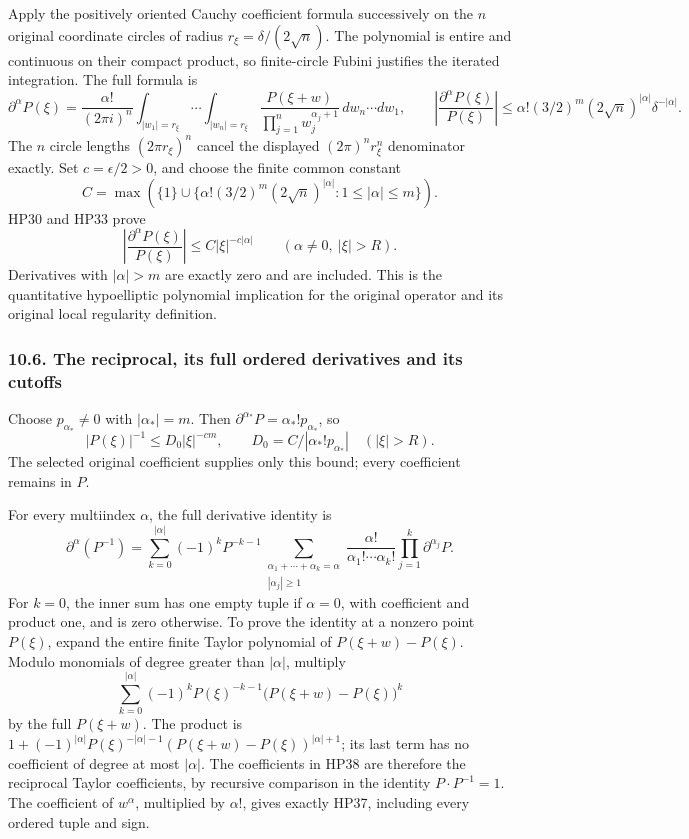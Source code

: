 \documentclass[
  11pt,
]{article}
\begin{document}
Apply the positively oriented Cauchy coefficient formula successively on
the \(n\) original coordinate circles of radius
\(r_\xi=\delta/(2\sqrt n)\). The polynomial is entire and continuous on
their compact product, so finite-circle Fubini justifies the iterated
integration. The full formula is \[
\partial^\alpha P(\xi)=
\frac{\alpha!}{(2\pi i)^n}
\int_{|w_1|=r_\xi}\cdots\int_{|w_n|=r_\xi}
\frac{P(\xi+w)}{\prod_{j=1}^{n}w_j^{\alpha_j+1}}\,
dw_n\cdots dw_1,
\qquad
\left|\frac{\partial^\alpha P(\xi)}{P(\xi)}\right|
\leq\alpha!(3/2)^m(2\sqrt n)^{|\alpha|}\delta^{-|\alpha|}.
\tag{HP33}
\] The \(n\) circle lengths \((2\pi r_\xi)^n\) cancel the displayed
\((2\pi)^n r_\xi^n\) denominator exactly. Set \(c=\epsilon/2>0\), and
choose the finite common constant \[
C=\max\left(\{1\}\cup
\{\alpha!(3/2)^m(2\sqrt n)^{|\alpha|}:1\leq|\alpha|\leq m\}\right).
\tag{HP34}
\] HP30 and HP33 prove \[
\left|\frac{\partial^\alpha P(\xi)}{P(\xi)}\right|
\leq C|\xi|^{-c|\alpha|}
\qquad(\alpha\ne0,\ |\xi|>R).
\tag{HP35}
\] Derivatives with \(|\alpha|>m\) are exactly zero and are included.
This is the quantitative hypoelliptic polynomial implication for the
original operator and its original local regularity definition.

\subsubsection{10.6. The reciprocal, its full ordered derivatives and
its
cutoffs}\label{the-reciprocal-its-full-ordered-derivatives-and-its-cutoffs}

Choose \(p_{\alpha_*}\ne0\) with \(|\alpha_*|=m\). Then
\(\partial^{\alpha_*}P=\alpha_*!p_{\alpha_*}\), so \[
|P(\xi)|^{-1}\leq D_0|\xi|^{-cm},\qquad
D_0=C/|\alpha_*!p_{\alpha_*}|\quad(|\xi|>R).
\tag{HP36}
\] The selected original coefficient supplies only this bound; every
coefficient remains in \(P\).

For every multiindex \(\alpha\), the full derivative identity is \[
\partial^\alpha(P^{-1})=
\sum_{k=0}^{|\alpha|}(-1)^kP^{-k-1}
\!\!\sum_{\substack{\alpha_1+\cdots+\alpha_k=\alpha\\|\alpha_j|\geq1}}
\frac{\alpha!}{\alpha_1!\cdots\alpha_k!}
\prod_{j=1}^{k}\partial^{\alpha_j}P.
\tag{HP37}
\] For \(k=0\), the inner sum has one empty tuple if \(\alpha=0\), with
coefficient and product one, and is zero otherwise. To prove the
identity at a nonzero point \(P(\xi)\), expand the entire finite Taylor
polynomial of \(P(\xi+w)-P(\xi)\). Modulo monomials of degree greater
than \(|\alpha|\), multiply \[
\sum_{k=0}^{|\alpha|}(-1)^kP(\xi)^{-k-1}
\big(P(\xi+w)-P(\xi)\big)^k
\tag{HP38}
\] by the full \(P(\xi+w)\). The product is
\(1+(-1)^{|\alpha|}P(\xi)^{-|\alpha|-1}
(P(\xi+w)-P(\xi))^{|\alpha|+1}\); its last term has no coefficient of
degree at most \(|\alpha|\). The coefficients in HP38 are therefore the
reciprocal Taylor coefficients, by recursive comparison in the identity
\(P\cdot P^{-1}=1\). The coefficient of \(w^\alpha\), multiplied by
\(\alpha!\), gives exactly HP37, including every ordered tuple and sign.
\end{document}
